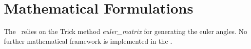%
%
% 
%

\section{Mathematical Formulations}
The \EulerDesc\ relies on the Trick method \textit{euler\_matrix} for generating the euler angles.  No further mathematical framework is implemented in the \EulerDesc.